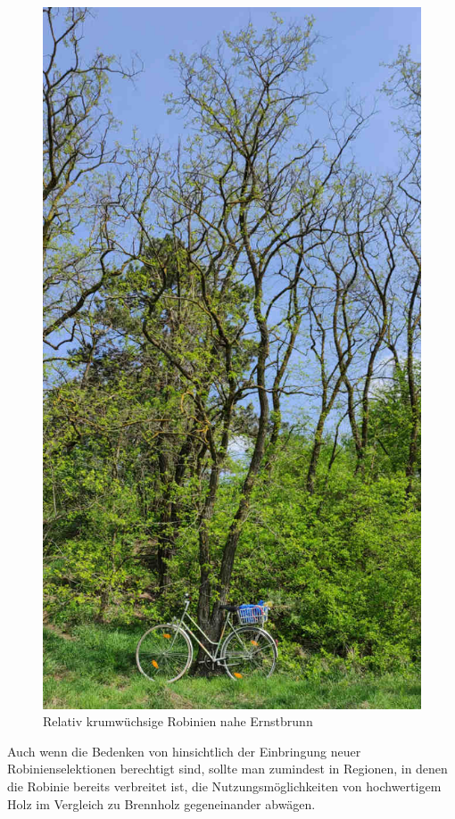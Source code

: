 \documentclass[twocolumn]{scrartcl}
\begin{document}
\begin{figure}[htbp]
  \centering
  \includegraphics[width=.9\linewidth]{./bild/roninieLokal}
  \caption{Relativ krumwüchsige Robinien nahe Ernstbrunn}
  \label{fig:robLokalErnstbrunn}
\end{figure}

Auch wenn die Bedenken von \citet{bouteiller2019robinie} hinsichtlich
der Einbringung neuer Robinienselektionen berechtigt sind, sollte man
zumindest in Regionen, in denen die Robinie bereits verbreitet ist,
die Nutzungsmöglichkeiten von hochwertigem Holz im Vergleich zu
Brennholz gegeneinander abwägen.
\end{document}
